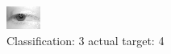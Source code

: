 \begin{figure}[h!]
\begin{center}
\includegraphics[width=0.60\columnwidth]{figures/ID2666_class_3_target_4.png}
\end{center}
\caption{ Classification: 3 actual target: 4}
\label{fig:ID2666_class_3_target_4}
\end{figure}
